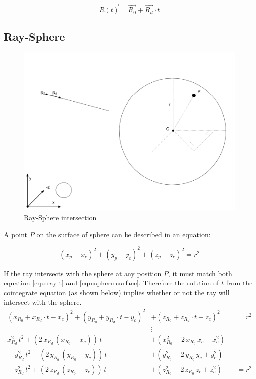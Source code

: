 \begin{equation}
\label{equ:ray-t}
\overrightarrow{R(t)} = \overrightarrow{R_0} + \overrightarrow{R_d} \cdot t
\end{equation}

\subsection{Ray-Sphere}
\label{section:ray-sphere}

\begin{figure}[H]
\caption{Ray-Sphere intersection}
\label{fig:ray-sphere}
\centering
\includegraphics[width=\textwidth, keepaspectratio]{Figures/ray-sphere-intersection.png}
\decoRule
\end{figure}

A point $P$ on the surface of sphere can be described in an equation:

\begin{equation}
\label{equ:sphere-surface}
(x_p - x_c)^2 + (y_p - y_c)^2 + (z_p - z_c)^2 = r^2
\end{equation}

If the ray intersects with the sphere at any position $P$, it must match both equation \ref{equ:ray-t} and \ref{equ:sphere-surface}. Therefore the solution of $t$ from the cointegrate equation (as shown below) implies whether or not the ray will intersect with the sphere.
\[
\begin{aligned}
(x_{R_0} + x_{R_d} \cdot t - x_c)^2 + (y_{R_0} + y_{R_d} \cdot t - y_c)^2 &+ (z_{R_0} + z_{R_d} \cdot t - z_c)^2 &&= r^2\\
&\vdots\\
x_{R_d}^2\,t^2 + (2\,x_{R_d}\,(x_{R_0} - x_c))\,t &+ (x_{R_0}^2 - 2\,x_{R_0}\,x_c + x_c^2)\\
+\;y_{R_d}^2\,t^2 + (2\,y_{R_d}\,(y_{R_0} - y_c))\,t &+ (y_{R_0}^2 - 2\,y_{R_0}\,y_c + y_c^2)\\
+\;z_{R_d}^2\,t^2 + (2\,z_{R_d}\,(z_{R_0} - z_c))\,t &+ (z_{R_0}^2 - 2\,z_{R_0}\,z_c + z_c^2) &&= r^2\\
\end{aligned}
\]

